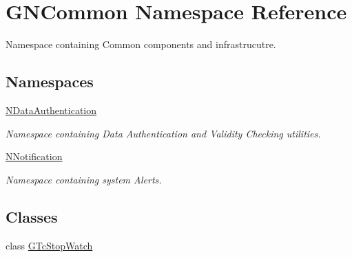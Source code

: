 \hypertarget{namespace_g_n_common}{}\section{G\+N\+Common Namespace Reference}
\label{namespace_g_n_common}


Namespace containing Common components and infrastrucutre.  


\subsection*{Namespaces}
\begin{DoxyCompactItemize}
\item 
 \mbox{\hyperlink{namespace_g_n_common_1_1_n_data_authentication}{N\+Data\+Authentication}}
\begin{DoxyCompactList}\small\item\em Namespace containing Data Authentication and Validity Checking utilities. \end{DoxyCompactList}\item 
 \mbox{\hyperlink{namespace_g_n_common_1_1_n_notification}{N\+Notification}}
\begin{DoxyCompactList}\small\item\em Namespace containing system Alerts. \end{DoxyCompactList}\end{DoxyCompactItemize}
\subsection*{Classes}
\begin{DoxyCompactItemize}
\item 
class \mbox{\hyperlink{class_g_n_common_1_1_g_tc_stop_watch}{G\+Tc\+Stop\+Watch}}
\end{DoxyCompactItemize}
